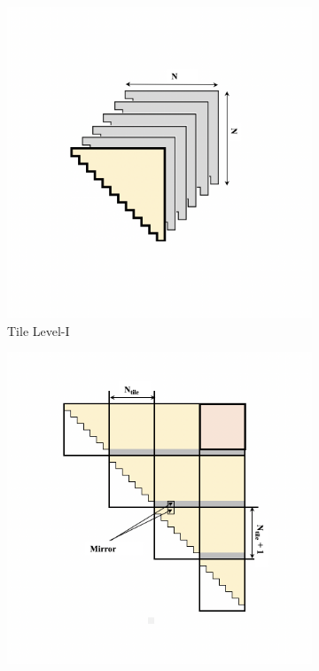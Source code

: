 \begin{figure}[htbp]
\begin{subfigure}[htbp]{0.22\linewidth}
    \includegraphics[scale=0.24, trim=2 2 2 2,clip]{content/figures/tile_1.png}
    \caption{Tile Level-I}
    \label{fig:tile_2}
    \end{subfigure}
    \begin{subfigure}[htbp]{0.22\linewidth}
    \centering
    \includegraphics[scale=0.24, trim=2 2 2 2,clip]{content/figures/tile_2.png}

\end{subfigure}
\end{figure}
